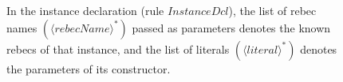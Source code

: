 \begin{figure}[!htbp]
\begin{center}
{ 		%
 		In the instance declaration (rule $InstanceDcl$), the list of rebec names $(\langle \mathit{rebecName} \rangle ^*)$ passed as parameters denotes the known rebecs of that instance, and the list of literals $(\langle literal \rangle ^*)$ denotes the parameters of its constructor.
 		 }
 		\label{fig::TRebecaSyntax}
 	\end{center}
 \end{figure}
